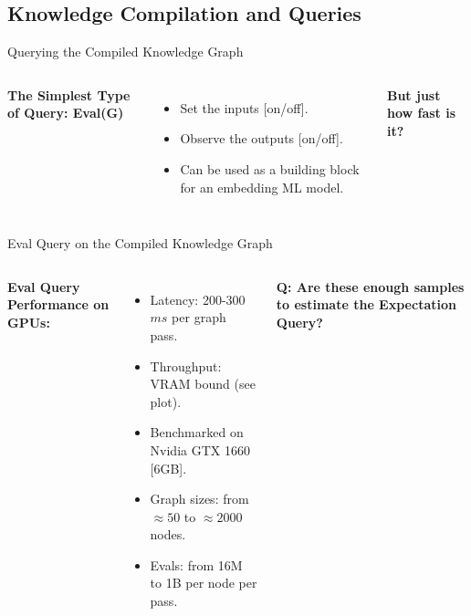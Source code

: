 \subsection{Knowledge Compilation and Queries}
\begin{frame}[t]{Querying the Compiled Knowledge Graph}
  \begin{columns}
    {
      \textbf{The Simplest Type of Query: Eval(G)}\par
      \begin{itemize}
          \item {Set the inputs [on/off].}
          \item {Observe the outputs [on/off].}
          \item {Can be used as a building block for an embedding ML model.}
      \end{itemize}\par
      \vspace{10pt}
      \textbf{But just how fast is it?}
    }
      \par %
  \end{columns}
\end{frame}


\begin{frame}[t]{Eval Query on the Compiled Knowledge Graph}
  \begin{columns}
    {
      \textbf{Eval Query Performance on GPUs:}
      \begin{itemize}
          \item {Latency: 200-300 $ms$ per graph pass.}
          \item {Throughput: VRAM bound (see plot).}
          \item {Benchmarked on Nvidia GTX 1660 [6GB].}
          \item {Graph sizes: from $\approx 50$ to $\approx 2000$ nodes.}
          \item {Evals: from 16M to 1B per node per pass.}
      \end{itemize}
      \vspace{10pt}
      \textbf{Q: Are these enough samples to estimate the Expectation Query?}
    }
        \centering
        
  \end{columns}
\end{frame}

